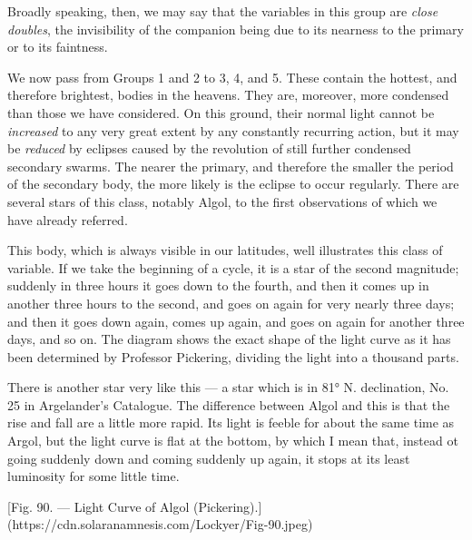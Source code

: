 \documentclass[a4paper, 12pt, oneside, polutonikogreek, english]{article}
\begin{document}
Broadly speaking, then, we may say that the variables in this group are \emph{close doubles}, the invisibility of the companion being due to its nearness to the primary or to its faintness.

We now pass from Groups 1 and 2 to 3, 4, and 5. These contain the hottest, and therefore brightest, bodies in the heavens. They are, moreover, more condensed than those we have considered. On this ground, their normal light cannot be \emph{increased} to any very great extent by any constantly recurring action, but it may be \emph{reduced} by eclipses caused by the revolution of still further condensed secondary swarms. The nearer the primary, and therefore the smaller the period of the secondary body, the more likely is the eclipse to occur regularly. There are several stars of this class, notably Algol, to the first observations of which we have already referred.

This body, which is always visible in our latitudes, well illustrates this class of variable. If we take the beginning of a cycle, it is a star of the second magnitude; suddenly in three hours it goes down to the fourth, and then it comes up in another three hours to the second, and goes on again for very nearly three days; and then it goes down again, comes up again, and goes on again for another three days, and so on. The diagram shows the exact shape of the light curve as it has been determined by Professor Pickering, dividing the light into a thousand parts.

There is another star very like this --- a star which is in 81° N. declination, No. 25 in Argelander's Catalogue. The difference between Algol and this is that the rise and fall are a little more rapid. Its light is feeble for about the same time as Argol, but the light curve is flat at the bottom, by which I mean that, instead ot going suddenly down and coming suddenly up again, it stops at its least luminosity for some little time.

[Fig. 90. --- Light Curve of Algol (Pickering).](https://cdn.solaranamnesis.com/Lockyer/Fig-90.jpeg)
\end{document}
